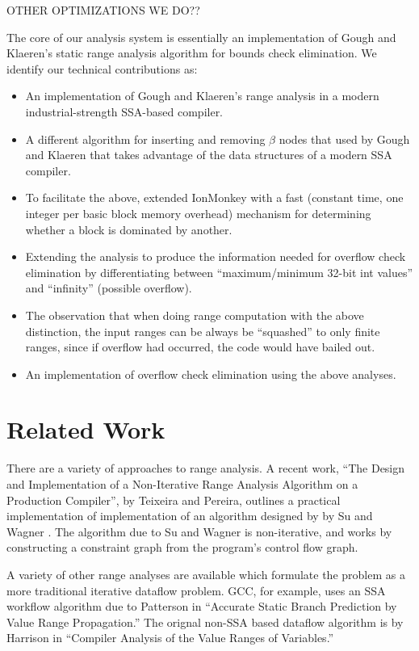 \documentclass{article}
\begin{document}
OTHER OPTIMIZATIONS WE DO??

The core of our analysis system is essentially an implementation of
Gough and Klaeren's static range analysis algorithm for bounds check
elimination.
We identify our technical contributions as:
\begin{itemize}
\item An implementation of Gough and Klaeren's range analysis in a
  modern industrial-strength SSA-based compiler.
\item A different algorithm for inserting and removing $\beta$ nodes
  that used by Gough and Klaeren that takes advantage of the data
  structures of a modern SSA compiler.
\item To facilitate the above, extended IonMonkey with a fast
  (constant time, one integer per basic block memory overhead) 
  mechanism for determining whether a block is dominated by another.
\item Extending the analysis to produce the information needed for
  overflow check elimination by differentiating between
  ``maximum/minimum 32-bit int values'' and ``infinity'' (possible
  overflow).
\item The observation that when doing range computation with the above
  distinction, the input ranges can be always be ``squashed'' to only
  finite ranges, since if overflow had occurred, the code would have
  bailed out.
\item An implementation of overflow check elimination using the above
  analyses.
\end{itemize}


\section{Related Work}
There are a variety of approaches to range analysis. A recent work, ``The Design
and Implementation of a Non-Iterative Range Analysis Algorithm on a
Production Compiler'', by Teixeira and Pereira, outlines a practical implementation of
implementation of an algorithm designed by by Su and Wagner
\cite{Su04aclass}. The algorithm due to Su and Wagner is
non-iterative, and works by constructing a constraint graph from the program's control flow graph.

A variety of other range analyses are available which formulate the problem as
a more traditional iterative dataflow problem. GCC, for example, uses an SSA
workflow algorithm due to Patterson in ``Accurate Static Branch Prediction by
Value Range Propagation.'' The orignal non-SSA based dataflow algorithm is by
Harrison in ``Compiler Analysis of the Value Ranges of Variables.''
\end{document}
